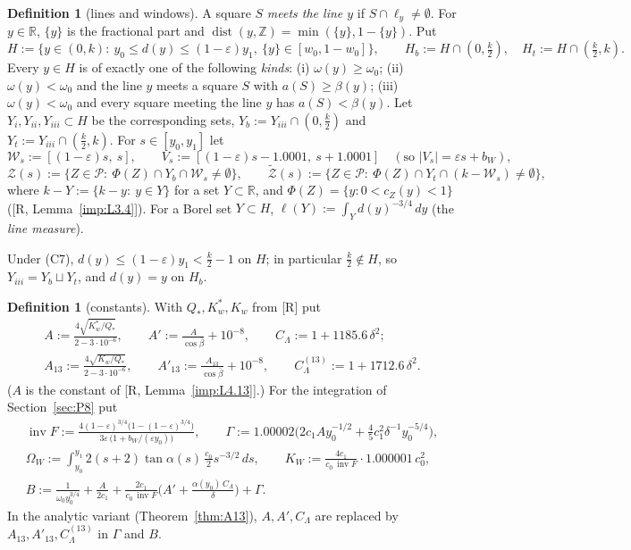 \documentclass[11pt]{amsart}
\newcommand{\R}{\mathbb R}
\newcommand{\Z}{\mathbb Z}
\newcommand{\dist}{\operatorname{dist}}
\newcommand{\invF}{\operatorname{inv}F}
\newcommand{\frc}[1]{\{#1\}}
\theoremstyle{definition}
\newtheorem{definition}[theorem]{Definition}
\theoremstyle{remark}
\numberwithin{equation}{section}
\begin{document}
\begin{definition}[lines and windows]\label{def:flows-lines}
A square $S$ \emph{meets the line $y$} if $S\cap\ell_y\ne\emptyset$. For $y\in\R$, $\frc y$ is the fractional part
and $\dist(y,\Z)=\min(\frc y,1-\frc y)$. Put
\[
H:=\{y\in(0,k):\ y_0\le d(y)\le(1-\varepsilon)y_1,\ \frc y\in[w_0,1-w_0]\},\qquad H_b:=H\cap(0,\tfrac k2),\quad
H_t:=H\cap(\tfrac k2,k).
\]
Every $y\in H$ is of exactly one of the following \emph{kinds}:
(i) $\omega(y)\ge\omega_0$;
(ii) $\omega(y)<\omega_0$ and the line $y$ meets a square $S$ with $a(S)\ge\beta(y)$;
(iii) $\omega(y)<\omega_0$ and every square meeting the line $y$ has $a(S)<\beta(y)$.
Let $Y_i,Y_{ii},Y_{iii}\subset H$ be the corresponding sets, $Y_b:=Y_{iii}\cap(0,\frac k2)$ and $Y_t:=Y_{iii}\cap(\frac k2,k)$.
For $s\in[y_0,y_1]$ let
\[
\mathcal W_s:=[(1-\varepsilon)s,\ s],\qquad V_s:=[(1-\varepsilon)s-1.0001,\ s+1.0001]\quad(\text{so }|V_s|=\varepsilon s+b_W),
\]
\[
\mathcal Z(s):=\{Z\in\mathcal P:\ \Phi(Z)\cap Y_b\cap\mathcal W_s\ne\emptyset\},\qquad
\tilde{\mathcal Z}(s):=\{Z\in\mathcal P:\ \Phi(Z)\cap Y_t\cap(k-\mathcal W_s)\ne\emptyset\},
\]
where $k-Y:=\{k-y:\ y\in Y\}$ for a set $Y\subset\R$, and $\Phi(Z)=\{y:0<c_Z(y)<1\}$ ([R, Lemma~\ref{imp:L3.4}]). For a Borel set $Y\subset H$,
$\ell(Y):=\int_Yd(y)^{-3/4}\,dy$ (the \emph{line measure}).
\end{definition}

Under (C7), $d(y)\le(1-\varepsilon)y_1<\frac k2-1$ on $H$; in particular $\frac k2\notin H$, so $Y_{iii}=Y_b\sqcup Y_t$,
and $d(y)=y$ on $H_b$.

\begin{definition}[constants]\label{def:flows-consts}
With $Q_*,K_w^*,K_w$ from [R] put
\begin{gather*}
A:=\frac{4\sqrt{K_w^*/Q_*}}{2-3\cdot10^{-6}},\qquad A':=\frac A{\cos\bar\beta}+10^{-8},\qquad C_\Lambda:=1+1185.6\,\delta^2;\\
A_{13}:=\frac{4\sqrt{K_w/Q_*}}{2-3\cdot10^{-6}},\qquad A'_{13}:=\frac{A_{13}}{\cos\bar\beta}+10^{-8},\qquad
C^{(13)}_\Lambda:=1+1712.6\,\delta^2 .
\end{gather*}
($A$ is the constant of [R, Lemma~\ref{imp:L4.13}].) For the integration of Section~\ref{sec:P8} put
\begin{gather*}
\invF:=\frac{4(1-\varepsilon)^{3/4}\big(1-(1-\varepsilon)^{3/4}\big)}{3\varepsilon\,\big(1+b_W/(\varepsilon y_0)\big)},\qquad
\Gamma:=1.00002\Big(2c_1Ay_0^{-1/2}+\tfrac45c_1^2\delta^{-1}y_0^{-5/4}\Big),\\
\Omega_W:=\int_{y_0}^{y_1}2(s+2)\tan\alpha(s)\,\frac{c_0}2s^{-3/2}\,ds,\qquad
K_W:=\frac{4c_1}{c_0\,\invF}\cdot1.000001\,c_0^2,\\
B:=\frac1{\omega_0y_0^{3/4}}+\frac A{2c_1}+\frac{2c_1}{c_0\,\invF}\Big(A'+\frac{\alpha(y_0)\,C_\Lambda}\delta\Big)+\Gamma .
\end{gather*}
In the analytic variant (Theorem~\ref{thm:A13}), $A,A',C_\Lambda$ are replaced by $A_{13},A'_{13},C^{(13)}_\Lambda$ in
$\Gamma$ and $B$.
\end{definition}
\end{document}
